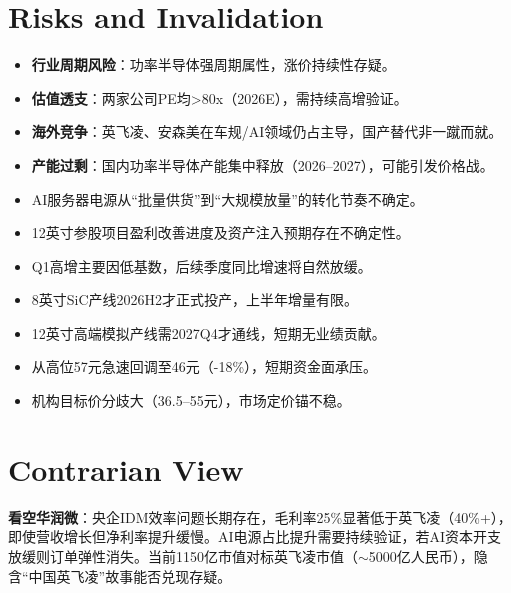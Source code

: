\documentclass[a4paper,11pt,fontset=none]{ctexart}
\begin{document}
\section{Risks and Invalidation}

\begin{riskbox}[共同风险]
\begin{itemize}
  \item \textbf{行业周期风险}：功率半导体强周期属性，涨价持续性存疑。
  \item \textbf{估值透支}：两家公司PE均>80x（2026E），需持续高增验证。
  \item \textbf{海外竞争}：英飞凌、安森美在车规/AI领域仍占主导，国产替代非一蹴而就。
  \item \textbf{产能过剩}：国内功率半导体产能集中释放（2026--2027），可能引发价格战。
\end{itemize}
\end{riskbox}

\begin{riskbox}[华润微特有风险]
\begin{itemize}
  \item AI服务器电源从``批量供货''到``大规模放量''的转化节奏不确定。
  \item 12英寸参股项目盈利改善进度及资产注入预期存在不确定性。
  \item Q1高增主要因低基数，后续季度同比增速将自然放缓。
\end{itemize}
\end{riskbox}

\begin{riskbox}[士兰微特有风险]
\begin{itemize}
  \item 8英寸SiC产线2026H2才正式投产，上半年增量有限。
  \item 12英寸高端模拟产线需2027Q4才通线，短期无业绩贡献。
  \item 从高位57元急速回调至46元（-18\%），短期资金面承压。
  \item 机构目标价分歧大（36.5--55元），市场定价锚不稳。
\end{itemize}
\end{riskbox}

\section{Contrarian View}

\textbf{看空华润微}：央企IDM效率问题长期存在，毛利率25\%显著低于英飞凌（40\%+），即使营收增长但净利率提升缓慢。AI电源占比提升需要持续验证，若AI资本开支放缓则订单弹性消失。当前1150亿市值对标英飞凌市值（$\sim$5000亿人民币），隐含``中国英飞凌''故事能否兑现存疑。
\end{document}
